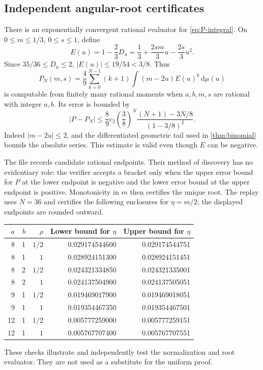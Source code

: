 \documentclass[11pt,letterpaper]{article}
\numberwithin{equation}{section}
\theoremstyle{definition}
\theoremstyle{remark}
\newcommand{\dd}{\,\mathrm d}
\begin{document}
\subsection{Independent angular-root certificates}
There is an exponentially convergent rational evaluator for
\eqref{eq:P-integral}. On $0\le m\le1/3$, $0\le s\le1$, define
\begin{equation}\label{eq:E-eval}
 E(u)=1-\frac23D_u=\frac13+\frac{2sm}{3}u-\frac{2s}{3}u^2.
\end{equation}
Since $35/36\le D_u\le2$,
$|E(u)|\le19/54<3/8$. Thus
\begin{equation}\label{eq:P-eval}
 P_N(m,s)=\frac49\sum_{k=0}^{N-1}(k+1)
             \int(m-2u)E(u)^k\dd\mu(u)
\end{equation}
is computable from finitely many rational moments when $a,b,m,s$ are
rational with integer $a,b$. Its error is bounded by
\begin{equation}\label{eq:P-error}
 |P-P_N|\le\frac89 c_2
       \left(\frac38\right)^N
       \frac{(N+1)-3N/8}{(1-3/8)^2}.
\end{equation}
Indeed $|m-2u|\le2$, and the differentiated geometric tail used in
\cref{thm:binomial} bounds the absolute series. This estimate is valid
even though $E$ can be negative.

The file  records candidate rational
endpoints. Their method of discovery has no evidentiary role: the
verifier accepts a bracket only when the upper error bound for $P$ at
the lower endpoint is negative and the lower error bound at the upper
endpoint is positive. Monotonicity in $m$ then certifies the unique
root. The replay uses $N=36$ and certifies the following enclosures for
$\eta=m/2$; the displayed endpoints are rounded outward.
\begin{center}
\begin{tabular}{@{}rrrrr@{}}
\toprule
$a$&$b$&$\rho$&Lower bound for $\eta$&Upper bound for $\eta$\\
\midrule
8&1&$1/2$&0.029174544600&0.029174544751\\
8&1&$1$  &0.028924151300&0.028924151451\\
8&2&$1/2$&0.024321334850&0.024321335001\\
8&2&$1$  &0.024137504900&0.024137505051\\
9&1&$1/2$&0.019469017900&0.019469018051\\
9&1&$1$  &0.019354467350&0.019354467501\\
12&1&$1/2$&0.005777259000&0.005777259151\\
12&1&$1$  &0.005767707400&0.005767707551\\
\bottomrule
\end{tabular}
\end{center}
These checks illustrate and independently test the normalization and
root evaluator. They are not used as a substitute for the uniform proof.
\end{document}
